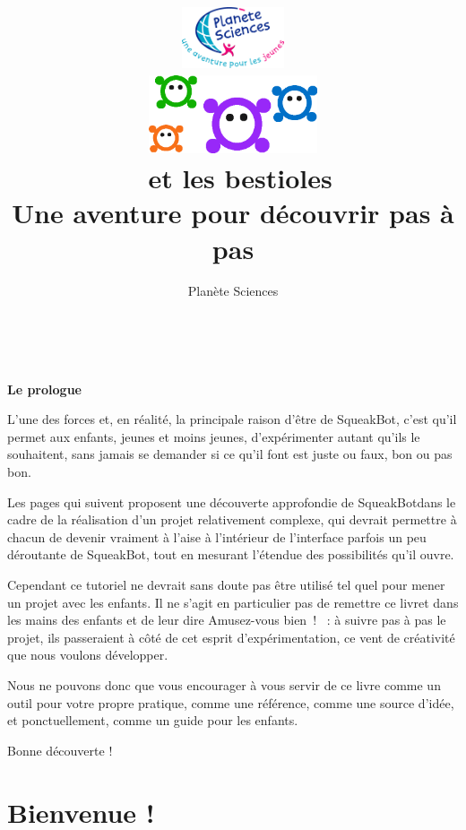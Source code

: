 \documentclass[a4paper,12pt]{book}
\title{
	\includegraphics[width=3cm]{national.png}\\
	\vfill
	\includegraphics[width=5cm]{bestioles.png}\\
	\vspace{3em}
	\LARGE{\textbf{\appName~et les bestioles}}\\[1cm]
	\large{Une aventure pour découvrir pas à pas \appName}\\[1cm]
	\vfill
}
\author{
Planète Sciences
}
\def\appName{SqueakBot}
\begin{document}
\sffamily
\allsectionsfont{\sffamily}

\maketitle

\tableofcontents


\clearpage
~
\vfill
\begin{center}
    \LARGE{\textbf{Le prologue}}
\end{center}

\vspace{3em}

L'une des forces et, en réalité, la principale raison d'être de \appName, c'est qu'il permet aux enfants, jeunes et moins jeunes, d'expérimenter autant qu'ils le souhaitent, sans jamais se demander si ce qu'il font est juste ou faux, bon ou pas bon.

Les pages qui suivent proposent une découverte approfondie de \appName dans le cadre de la réalisation d'un projet relativement complexe, qui devrait permettre à chacun de devenir vraiment à l'aise à l'intérieur de l'interface parfois un peu déroutante de \appName, tout en mesurant l'étendue des possibilités qu'il ouvre.

Cependant ce tutoriel ne devrait sans doute pas être utilisé tel quel pour mener un projet avec les enfants. Il ne s'agit en particulier pas de remettre ce livret dans les mains des enfants et de leur dire \og Amusez-vous bien~! \fg~: à suivre pas à pas le projet, ils passeraient à côté de cet esprit d'expérimentation, ce vent de créativité que nous voulons développer.

Nous ne pouvons donc que vous encourager à vous servir de ce livre comme un outil pour votre propre pratique, comme une référence, comme une source d'idée, et ponctuellement, comme un guide pour les enfants.

Bonne découverte !

\vfill

\chapter{Bienvenue !}
\end{document}
